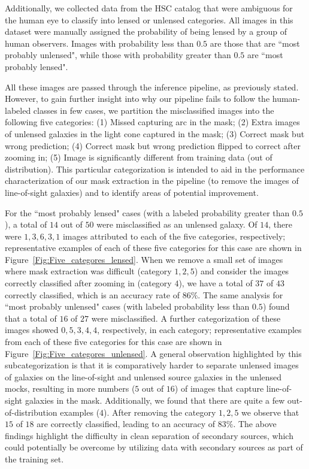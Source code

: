 \documentclass[12pt, twocolumn, apj]{openjournal}
\begin{document}
Additionally, we collected data from the HSC catalog that were ambiguous for the human eye to classify into lensed or unlensed categories. All images in this dataset were manually assigned the probability of being lensed by a group of human observers. 
Images with probability less than $0.5$ are those that are ``most probably unlensed", while those with probability greater than $0.5$ are ``most probably lensed". 

All these images are passed through the inference pipeline, as previously stated. However, to gain further insight into why our pipeline fails to follow the human-labeled classes in few cases, we partition the misclassified images into the following five categories: (1) Missed capturing arc in the mask; (2) Extra images of unlensed galaxies in the light cone captured in the mask; (3) Correct mask but wrong prediction; (4) Correct mask but wrong prediction flipped to correct after zooming in; (5) Image is significantly different from training data (out of distribution). 
This particular categorization is intended to aid in the performance characterization of our mask extraction in the pipeline (to remove the images of line-of-sight galaxies) and to identify areas of potential improvement.

For the ``most probably lensed" cases (with a labeled probability greater than $0.5$), a total of $14$ out of $50$ were misclassified as an unlensed galaxy. Of $14$, there were $1, 3, 6, 3, 1$ images attributed to each of the five categories, respectively; representative examples of each of these five categories for this case are shown in Figure~\ref{Fig:Five_categores_lensed}. When we remove a small set of images where mask extraction was difficult (category $1,2,5$) and consider the images correctly classified after zooming in (category $4$), we have a total of $37$ of $43$ correctly classified, which is an accuracy rate of $86\%$. 
The same analysis for ``most probably unlensed" cases (with labeled probability less than $0.5$) found that a total of $16$ of $27$ were misclassified. A further categorization of these images showed $0, 5, 3, 4, 4$, respectively, in each category; representative examples from each of these five categories for this case are shown in Figure~\ref{Fig:Five_categores_unlensed}. A general observation highlighted by this subcategorization is that it is comparatively harder to separate unlensed images of galaxies on the line-of-sight and unlensed source galaxies in the unlensed mocks, resulting in more numbers ($5$ out of $16$) of images that capture line-of-sight galaxies in the mask. Additionally, we found that there are quite a few out-of-distribution examples ($4$). After removing the category $1,2,5$ we observe that $15$ of $18$ are correctly classified, leading to an accuracy of $83\%$.
The above findings highlight the difficulty in clean separation of secondary sources, which could potentially be overcome by utilizing data with secondary sources as part of the training set.
\end{document}
